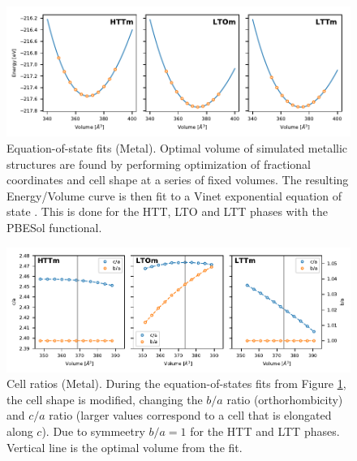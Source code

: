 \begin{figure}
    \centering
    \includegraphics[width=\textwidth]{fig/simulation/eos_metal_all.pdf}
    \caption[Metal: Equation-of-state fits]{Equation-of-state fits (Metal). Optimal volume of simulated metallic structures are found by performing optimization of fractional coordinates and cell shape at a series of fixed volumes. The resulting Energy/Volume curve is then fit to a Vinet exponential equation of state \cite{Vinet1987}. This is done for the HTT, LTO and LTT phases with the PBESol functional.}
    \label{fig:eos_metal_all}
\end{figure}

\begin{figure}
    \centering
    \includegraphics[width=\textwidth]{fig/simulation/ratio_metal_all.pdf}
    \caption[Metal: Cell ratios during EOS fits]{Cell ratios (Metal). During the equation-of-states fits from Figure \ref{fig:eos_metal_all}, the cell shape is modified, changing the $b/a$ ratio (orthorhombicity) and $c/a$ ratio (larger values correspond to a cell that is elongated along $c$). Due to symmeetry $b/a = 1$ for the HTT and LTT phases. Vertical line is the optimal volume from the fit.}
    \label{fig:eos_ratios_metal}
\end{figure}

